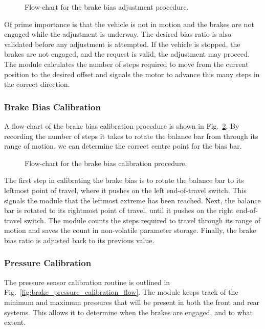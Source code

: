 \begin{figure}[H]
	\centering
	
	\caption{Flow-chart for the brake bias adjustment procedure.}
	\label{fig:design-braking-bias-adjustment}
\end{figure}

Of prime importance is that the vehicle is not in motion and the brakes are not engaged while the adjustment is underway. The desired bias ratio is also validated before any adjustment is attempted. If the vehicle is stopped, the brakes are not engaged, and the request is valid, the adjustment may proceed. The module calculates the number of steps required to move from the current position to the desired offset and signals the motor to advance this many steps in the correct direction.

\subsubsection{Brake Bias Calibration}

A flow-chart of the brake bias calibration procedure is shown in Fig.\ \ref{fig:brake_bias_calibration_flow}. By recording the number of steps it takes to rotate the balance bar from through its range of motion, we can determine the correct centre point for the bias bar. 

\begin{figure}[H]
	\centering
	
	\caption{Flow-chart for the brake bias calibration procedure.}
	\label{fig:brake_bias_calibration_flow}
\end{figure}

The first step in calibrating the brake bias is to rotate the balance bar to its leftmost point of travel, where it pushes on the left end-of-travel switch. This signals the module that the leftmost extreme has been reached. Next, the balance bar is rotated to its rightmost point of travel, until it pushes on the right end-of-travel switch. The module counts the steps required to travel through its range of motion and saves the count in non-volatile parameter storage. Finally, the brake bias ratio is adjusted back to its previous value.

\subsubsection{Pressure Calibration}

The pressure sensor calibration routine is outlined in Fig.\ \ref{fig:brake_pressure_calibration_flow}. The module keeps track of the minimum and maximum pressures that will be present in both the front and rear systems. This allows it to determine when the brakes are engaged, and to what extent.

